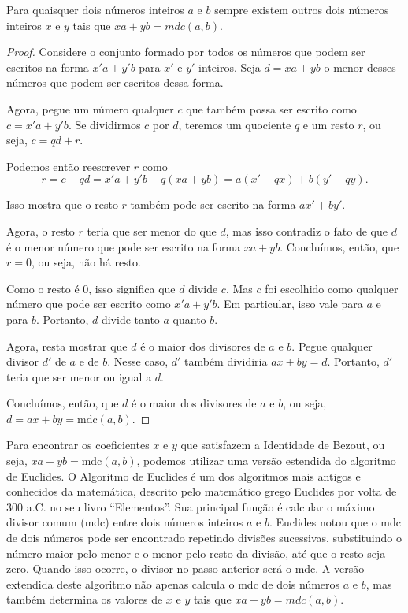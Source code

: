\begin{proposition}
  Para quaisquer dois números inteiros $a$ e $b$ sempre existem outros dois números inteiros $x$ e $y$ tais que $xa + yb = mdc(a,b)$.
\end{proposition}
\begin{proof}
Considere o conjunto formado por todos os números que podem ser escritos na forma $x'a + y'b$ para $x'$ e $y'$ inteiros.
Seja $d = xa + yb$ o menor desses números que podem ser escritos dessa forma.

Agora, pegue um número qualquer $c$ que também possa ser escrito como $c = x'a + y'b$.
Se dividirmos $c$ por $d$, teremos um quociente $q$ e um resto $r$, ou seja, $c = qd + r$.

Podemos então reescrever $r$ como
\begin{displaymath}
r = c - qd = x'a + y'b - q(xa + yb) = a(x' - qx) + b(y' - qy).
\end{displaymath}

Isso mostra que o resto $r$ também pode ser escrito na forma $ax' + by'$.

Agora, o resto $r$ teria que ser menor do que $d$, mas isso contradiz o fato de que $d$ é o menor número que pode ser escrito na forma $xa + yb$.
Concluímos, então, que $r = 0$, ou seja, não há resto.

Como o resto é 0, isso significa que $d$ divide $c$.
Mas $c$ foi escolhido como qualquer número que pode ser escrito como $x'a + y'b$.
Em particular, isso vale para $a$ e para $b$.
Portanto, $d$ divide tanto $a$ quanto $b$.

Agora, resta mostrar que $d$ é o maior dos divisores de $a$ e $b$.
Pegue qualquer divisor $d'$ de $a$ e de $b$.
Nesse caso, $d'$ também dividiria $ax + by = d$.
Portanto, $d'$ teria que ser menor ou igual a $d$.

Concluímos, então, que $d$ é o maior dos divisores de $a$ e $b$, ou seja, $d = ax + by = \text{mdc}(a,b)$.
\end{proof}


Para encontrar os coeficientes $x$ e $y$ que satisfazem a Identidade de Bezout, ou seja, $xa + yb = \text{mdc}(a, b)$, podemos utilizar uma versão estendida do algoritmo de Euclides.
O Algoritmo de Euclides é um dos algoritmos mais antigos e conhecidos da matemática, descrito pelo matemático grego Euclides por volta de 300 a.C. no seu livro ``Elementos''.
Sua principal função é calcular o máximo divisor comum (mdc) entre dois números inteiros $a$ e $b$.
Euclides notou que o mdc de dois números pode ser encontrado repetindo divisões sucessivas, substituindo o número maior pelo menor e o menor pelo resto da divisão, até que o resto seja zero.
Quando isso ocorre, o divisor no passo anterior será o mdc.
A versão extendida deste algoritmo não apenas calcula o mdc de dois números $a$ e $b$, mas também determina os valores de $x$ e $y$ tais que $xa + yb = mdc(a,b)$.

